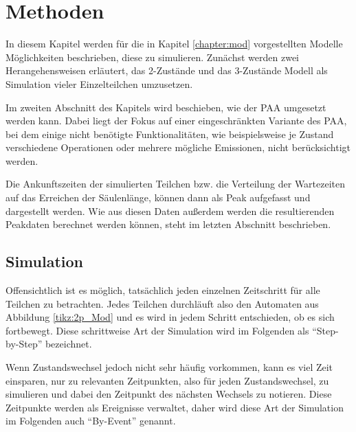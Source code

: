 \chapter{Methoden} 
\label{chapter:meth}

In diesem Kapitel werden für die in Kapitel \ref{chapter:mod} vorgestellten Modelle Möglichkeiten beschrieben, diese zu simulieren. 
Zunächst werden zwei Herangehensweisen erläutert, das 2-Zustände und das 3-Zustände Modell als Simulation vieler Einzelteilchen umzusetzen.

Im zweiten Abschnitt des Kapitels wird beschieben, wie der PAA umgesetzt werden kann. Dabei liegt der Fokus auf einer eingeschränkten Variante des PAA, bei dem einige nicht benötigte Funktionalitäten, wie beispielsweise je Zustand verschiedene Operationen oder mehrere mögliche Emissionen, nicht berücksichtigt werden.

Die Ankunftszeiten der simulierten Teilchen bzw. die Verteilung der Wartezeiten auf das Erreichen der Säulenlänge, können dann als Peak aufgefasst und dargestellt werden. Wie aus diesen Daten außerdem werden die resultierenden Peakdaten berechnet werden können, steht im letzten Abschnitt beschrieben.

\section{Simulation}
Offensichtlich ist es möglich, tatsächlich jeden einzelnen Zeitschritt für alle Teilchen zu betrachten. Jedes Teilchen durchläuft also den Automaten aus Abbildung \ref{tikz:2p_Mod} und es wird in jedem Schritt entschieden, ob es sich fortbewegt. Diese schrittweise Art der Simulation wird im Folgenden als ``Step-by-Step'' bezeichnet.

Wenn Zustandswechsel jedoch nicht sehr häufig vorkommen, kann es viel Zeit einsparen, nur zu relevanten Zeitpunkten, also für jeden Zustandswechsel, zu simulieren und dabei den Zeitpunkt des nächsten Wechsels zu notieren. Diese Zeitpunkte werden als Ereignisse verwaltet, daher wird diese Art der Simulation im Folgenden auch ``By-Event'' genannt.


